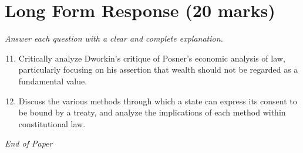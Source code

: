 \documentclass[12pt]{article}
\begin{document}
\section*{Long Form Response (20 marks)}
\textit{Answer each question with a clear and complete explanation.}
\begin{enumerate}[label=\arabic*.]
\setcounter{enumi}{10}
\item Critically analyze Dworkin's critique of Posner's economic analysis of law, particularly focusing on his assertion that wealth should not be regarded as a fundamental value.
\item Discuss the various methods through which a state can express its consent to be bound by a treaty, and analyze the implications of each method within constitutional law.
\end{enumerate}

\vfill
\noindent\textit{End of Paper}
\end{document}
